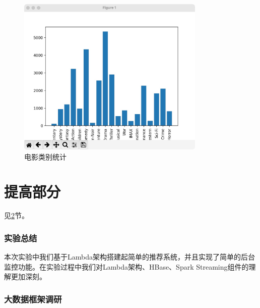 \documentclass[lang=cn,11pt,a4paper,cite=authornum]{paper}
\begin{document}
\begin{figure}[!htb]
    \centering
    \includegraphics[width=0.8\textwidth]{./images/7.jpg}
    \caption{电影类别统计\label{fig:7}}
\end{figure}

\part{提高部分}

见\ref{survey}节。

\section{实验总结}

本次实验中我们基于Lambda架构搭建起简单的推荐系统，并且实现了简单的后台监控功能。在实验过程中我们对Lambda架构、HBase、Spark Streaming组件的理解更加深刻。

\newpage

\appendix

\section{大数据框架调研}

\label{survey}
\end{document}
